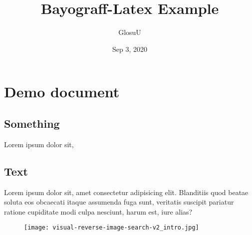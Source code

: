 \documentclass[12pt, a4paper]{article}
\author{GlosuU}
\title{Bayograff-Latex Example}
\date{Sep 3, 2020}
\begin{document}
\maketitle
\tableofcontents
\section{Demo document}

\subsection{Something}
Lorem ipsum dolor sit,

\subsection{Text}
Lorem ipsum dolor sit, amet consectetur adipisicing elit. Blanditiis quod beatae soluta eos obcaecati itaque assumenda fuga sunt, veritatis suscipit pariatur ratione cupiditate modi culpa nesciunt, harum est, iure alias?


\begin{figure}
  \centering
  \texttt{[image: visual-reverse-image-search-v2\_intro.jpg]}
\end{figure}
\end{document}
